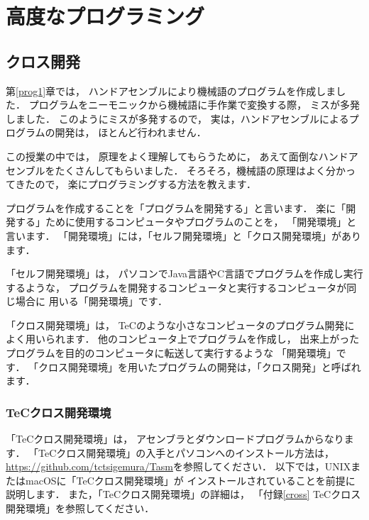 \renewcommand{\myincludegraphics}[2]{\texttt{[image: chap6/\#1]}}

\chapter{高度なプログラミング\label{prog2}}

\section{クロス開発}

第\ref{prog1}章では，
ハンドアセンブルにより機械語のプログラムを作成しました．
プログラムをニーモニックから機械語に手作業で変換する際，
ミスが多発しました．
このようにミスが多発するので，
実は，ハンドアセンブルによるプログラムの開発は，
ほとんど行われません．

この授業の中では，
原理をよく理解してもらうために，
あえて面倒なハンドアセンブルをたくさんしてもらいました．
そろそろ，機械語の原理はよく分かってきたので，
楽にプログラミングする方法を教えます．

プログラムを作成することを「プログラムを開発する」と言います．
楽に「開発する」ために使用するコンピュータやプログラムのことを，
「開発環境」と言います．
「開発環境」には，「セルフ開発環境」と「クロス開発環境」があります．

「セルフ開発環境」は，
パソコンでJava言語やC言語でプログラムを作成し実行するような，
プログラムを開発するコンピュータと実行するコンピュータが同じ場合に
用いる「開発環境」です．

「クロス開発環境」は，
TeCのような小さなコンピュータのプログラム開発によく用いられます．
他のコンピュータ上でプログラムを作成し，
出来上がったプログラムを目的のコンピュータに転送して実行するような
「開発環境」です．
「クロス開発環境」を用いたプログラムの開発は，「クロス開発」と呼ばれます．

\subsection{TeCクロス開発環境}
「TeCクロス開発環境」は，
アセンブラとダウンロードプログラムからなります．
「TeCクロス開発環境」の入手とパソコンへのインストール方法は，
\url{https://github.com/tctsigemura/Tasm}を参照してください．
以下では，UNIXまたはmacOSに「TeCクロス開発環境」が
インストールされていることを前提に説明します．
また，「TeCクロス開発環境」の詳細は，
「付録\ref{cross} TeCクロス開発環境」を参照してください．

